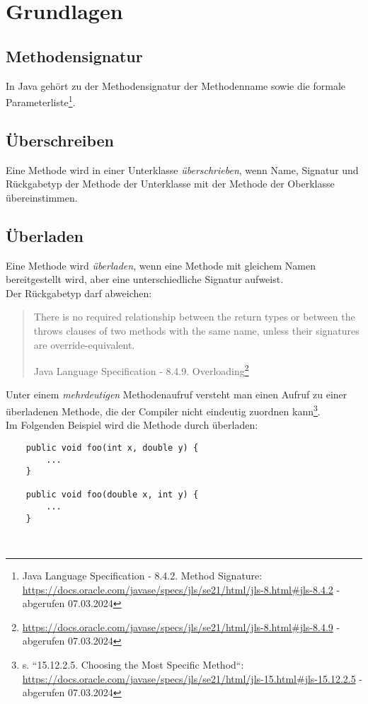 \section{Grundlagen}

\subsection{Methodensignatur}
In Java gehört zu der Methodensignatur der Methodenname sowie die formale Parameterliste\footnote {
    Java Language Specification - 8.4.2. Method Signature: \url{https://docs.oracle.com/javase/specs/jls/se21/html/jls-8.html#jls-8.4.2} - abgerufen 07.03.2024
}.

\subsection{Überschreiben}
Eine Methode wird in einer Unterklasse \textit{überschrieben}, wenn Name, Signatur und Rückgabetyp der Methode der Unterklasse mit der
Methode der Oberklasse übereinstimmen.\\


\subsection{Überladen}
Eine Methode wird \textit{überladen}, wenn eine Methode mit gleichem Namen bereitgestellt wird, aber eine unterschiedliche Signatur
aufweist.\\
Der Rückgabetyp darf abweichen:
\blockquote[Java Language Specification - 8.4.9. Overloading\footnote{\url{https://docs.oracle.com/javase/specs/jls/se21/html/jls-8.html#jls-8.4.9} - abgerufen 07.03.2024}]{
    There is no required relationship between the return types or between the throws clauses of two methods with the same name, unless their signatures are override-equivalent.
}

\noindent
Unter einem \textit{mehrdeutigen} Methodenaufruf versteht man einen Aufruf zu einer überladenen Methode, die der Compiler nicht eindeutig zuordnen kann\footnote{
s. ``15.12.2.5. Choosing the Most Specific Method``: \url{https://docs.oracle.com/javase/specs/jls/se21/html/jls-15.html#jls-15.12.2.5} - abgerufen 07.03.2024
}.\\
Im Folgenden Beispiel wird die Methode  durch  überladen:

\begin{verbatim}
    public void foo(int x, double y) {
        ...
    }

    public void foo(double x, int y) {
        ...
    }
\end{verbatim}\\

